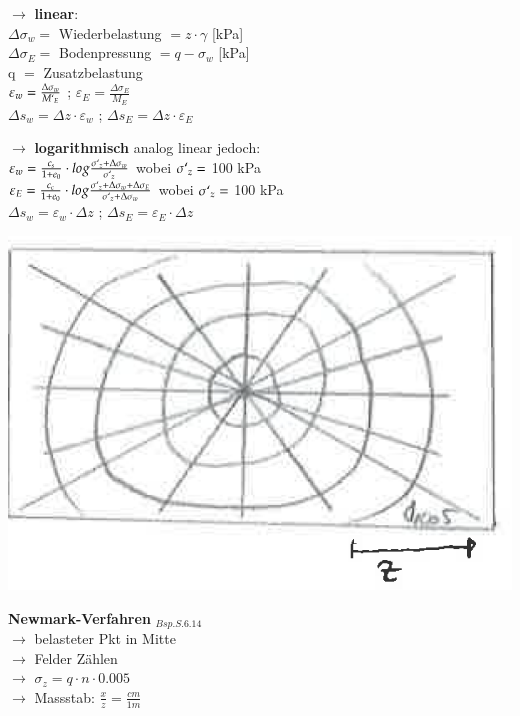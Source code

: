 \begin{minipage}{0.5\linewidth}
	$\rightarrow$ \textbf{linear}: \\
	$\Delta \sigma_w=$ Wiederbelastung $=z \cdot \gamma$ [kPa] \\
	$\Delta \sigma_E=$ Bodenpressung $=q - \sigma_w$ [kPa] \\
	q $=$ Zusatzbelastung \\
	$\varepsilon_w = \frac{\Delta \sigma_w}{M`_E}$ ; $\varepsilon_E = \frac{\Delta \sigma_E}{M_E}$ \\
	$\Delta s_w = \Delta z \cdot\varepsilon_w$ ; $\Delta s_E = \Delta z \cdot\varepsilon_E$\\
\end{minipage}	
\begin{minipage}{0.5\linewidth}
	$\rightarrow$ \textbf{logarithmisch} analog linear jedoch: \\
	$\varepsilon_w = \frac{c_s}{1 + e_0} \cdot log \frac{\sigma`_z + \Delta \sigma_w}{\sigma`_z}$ wobei $\sigma`_z =$ 100 kPa \\
	$\varepsilon_E = \frac{c_c}{1 + e_0} \cdot log \frac{\sigma`_z + \Delta \sigma_w + \Delta \sigma_E}{\sigma`_z + \Delta \sigma_w}$ wobei $\sigma`_z =$ 100 kPa \\
	$\Delta s_w= \varepsilon_w \cdot \Delta z$ ; $\Delta s_E= \varepsilon_E \cdot \Delta z$ \\
		\vspace{\baselineskip}
\end{minipage}


\begin{minipage}{0.2\linewidth}
	\includegraphics[width=\linewidth]{images/SpimBoden3Newmark.PNG}
\end{minipage}
\begin{minipage}{0.5\linewidth}
	\medskip
		\textbf{Newmark-Verfahren} $_{Bsp. S. 6.14}$ \\
		$\rightarrow$ belasteter Pkt in Mitte \\ 
		$\rightarrow$ Felder Zählen \\
		$\rightarrow$ $\sigma_z=q \cdot n \cdot 0.005$ \\
		$\rightarrow$ Massstab: $\frac{x}{z} = \frac{cm}{1m}$ \\
\end{minipage}




